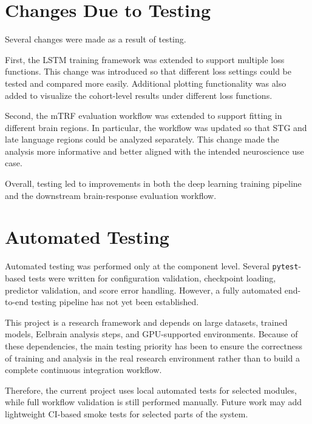 \documentclass[12pt, titlepage]{article}
\begin{document}
\section{Changes Due to Testing}



Several changes were made as a result of testing.

First, the LSTM training framework was extended to support multiple loss functions.
This change was introduced so that different loss settings could be tested and compared more easily.
Additional plotting functionality was also added to visualize the cohort-level results under different loss functions.

Second, the mTRF evaluation workflow was extended to support fitting in different brain regions.
In particular, the workflow was updated so that STG and late language regions could be analyzed separately.
This change made the analysis more informative and better aligned with the intended neuroscience use case.

Overall, testing led to improvements in both the deep learning training pipeline and the downstream brain-response evaluation workflow.







\section{Automated Testing}

Automated testing was performed only at the component level.
Several \texttt{pytest}-based tests were written for configuration validation, checkpoint loading, predictor validation, and score error handling.
However, a fully automated end-to-end testing pipeline has not yet been established.

This project is a research framework and depends on large datasets, trained models, Eelbrain analysis steps, and GPU-supported environments.
Because of these dependencies, the main testing priority has been to ensure the correctness of training and analysis in the real research environment rather than to build a complete continuous integration workflow.

Therefore, the current project uses local automated tests for selected modules, while full workflow validation is still performed manually.
Future work may add lightweight CI-based smoke tests for selected parts of the system.
\end{document}
